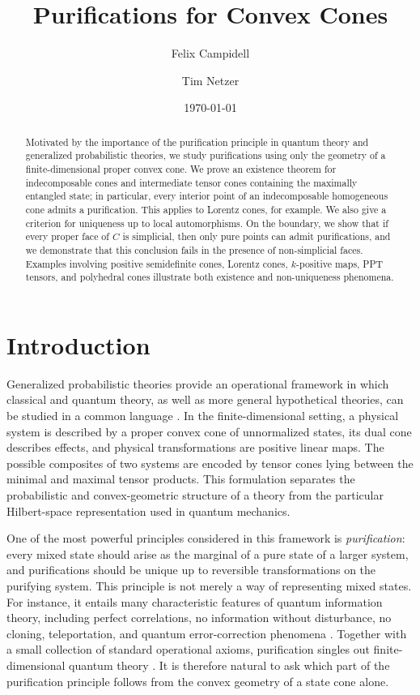 \documentclass[11pt]{article}
\title{Purifications for Convex Cones}
\author{Felix Campidell}
\author{Tim Netzer}
\affil{Department of Mathematics, University of Innsbruck, Austria}
\date{\today}
\theoremstyle{result}
\theoremstyle{discussion}
\begin{document}
\maketitle

\begin{abstract}
Motivated by the importance of the purification principle in quantum theory and generalized probabilistic
theories, we study purifications using only the geometry of a
finite-dimensional proper convex cone.
We prove an existence theorem for indecomposable cones and intermediate
tensor cones containing the maximally entangled state; in particular, every
interior point of an indecomposable homogeneous cone admits a purification. This applies to Lorentz cones, for example.
We also give a criterion for uniqueness up to local automorphisms.  On the
boundary, we show that if every proper face of $C$ is simplicial, then only
pure points can admit purifications, and we demonstrate that this conclusion
fails in the presence of non-simplicial faces.  Examples involving positive
semidefinite cones, Lorentz cones, $k$-positive maps, PPT tensors, and
polyhedral cones illustrate both existence and non-uniqueness phenomena.
\end{abstract}

\section{Introduction}

Generalized probabilistic theories provide an operational framework in which
classical and quantum theory, as well as more general hypothetical theories,
can be studied in a common language \citep{Barrett2007,Plavala2023}.  In the
finite-dimensional setting, a physical system is described by a proper
convex cone of unnormalized states, its dual cone describes effects, and
physical transformations are positive linear maps.  The possible composites
of two systems are encoded by tensor cones lying between the minimal and
maximal tensor products.  This formulation separates the probabilistic and
convex-geometric structure of a theory from the particular Hilbert-space
representation used in quantum mechanics.

One of the most powerful principles considered in this framework is
\emph{purification}: every mixed state should arise as the marginal of a pure
state of a larger system, and purifications should be unique up to reversible
transformations on the purifying system.  This principle is not merely a way
of representing mixed states. For instance, it entails many characteristic features of quantum
information theory, including perfect correlations, no information without
disturbance, no cloning, teleportation, and quantum error-correction
phenomena \citep{ChiribellaEtAl2010}.  Together with a small collection of
standard operational axioms, purification singles out finite-dimensional
quantum theory \citep{ChiribellaEtAl2011}.  It is therefore natural to ask
which part of the purification principle follows from the convex geometry of
a state cone alone.
\end{document}
